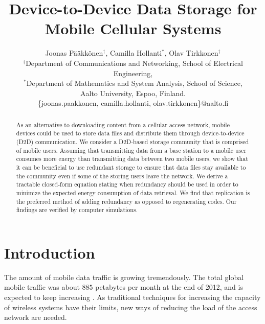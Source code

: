 \documentclass[10pt,conference]{IEEEtran}
\begin{document}
\title{Device-to-Device Data Storage for Mobile Cellular Systems}

\author{Joonas P\"a\"akk\"onen$^{\dagger}$, Camilla Hollanti$^{*}$, Olav Tirkkonen$^{\dagger}$
\\
$^\dagger$Department of Communications and Networking, School of Electrical Engineering, \\
$^*$Department of Mathematics and System Analysis, School of Science, \\
Aalto University, Espoo, Finland. \\
\{joonas.paakkonen, camilla.hollanti, olav.tirkkonen\}@aalto.fi}

\maketitle

\begin{abstract}
As an alternative to downloading content from a cellular access
network, mobile devices could be used to store data files and distribute them
through device-to-device (D2D) communication. We consider a D2D-based
storage community that is comprised of mobile users. Assuming that transmitting data from a
base station to a mobile user consumes more energy than transmitting
data between two mobile users, we show that it can be beneficial to
use redundant storage to ensure that data files stay available to the
community even if some of the storing users leave the network. We derive a
tractable closed-form equation stating when redundancy should be used
in order to minimize the expected energy consumption of data
retrieval. We find that replication is the preferred method of adding
redundancy as opposed to regenerating codes. Our
findings are verified by computer simulations.
\end{abstract}

\section{Introduction}\label{introductionsec}

The amount of mobile data traffic is growing tremendously. The total
global mobile traffic was about $885$ petabytes per month at the end
of 2012, and is expected to keep increasing \cite{cisco}. 
As traditional techniques for increasing the capacity of wireless
systems have their limits, new ways of reducing the load of the access
network are needed.
\end{document}
